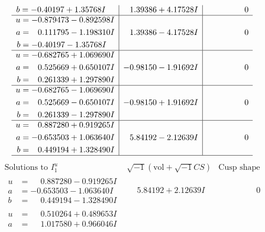 \documentclass[1p]{elsarticle_modified}
\theoremstyle{definition}
\newcommand{\I}{\sqrt{-1}}
\begin{document}
$$\begin{array}{c|c|c}
\begin{aligned}
b &= -0.40197 + 1.35768 I\end{aligned}
 & \phantom{-}1.39386 + 4.17528 I & \phantom{-0.000000 } 0 \\ \hline\begin{aligned}
u &= -0.879473 - 0.892598 I \\
a &= \phantom{-}0.111795 - 1.198310 I \\
b &= -0.40197 - 1.35768 I\end{aligned}
 & \phantom{-}1.39386 - 4.17528 I & \phantom{-0.000000 } 0 \\ \hline\begin{aligned}
u &= -0.682765 + 1.069690 I \\
a &= \phantom{-}0.525669 + 0.650107 I \\
b &= \phantom{-}0.261339 + 1.297890 I\end{aligned}
 & -0.98150 - 1.91692 I & \phantom{-0.000000 } 0 \\ \hline\begin{aligned}
u &= -0.682765 - 1.069690 I \\
a &= \phantom{-}0.525669 - 0.650107 I \\
b &= \phantom{-}0.261339 - 1.297890 I\end{aligned}
 & -0.98150 + 1.91692 I & \phantom{-0.000000 } 0 \\ \hline\begin{aligned}
u &= \phantom{-}0.887280 + 0.919265 I \\
a &= -0.653503 + 1.063640 I \\
b &= \phantom{-}0.449194 + 1.328490 I\end{aligned}
 & \phantom{-}5.84192 - 2.12639 I & \phantom{-0.000000 } 0\\
 \hline 
 \end{array}$$\newpage$$\begin{array}{c|c|c}  
\text{Solutions to }I^u_{1}& \I (\text{vol} + \sqrt{-1}CS) & \text{Cusp shape}\\
 \hline 
\begin{aligned}
u &= \phantom{-}0.887280 - 0.919265 I \\
a &= -0.653503 - 1.063640 I \\
b &= \phantom{-}0.449194 - 1.328490 I\end{aligned}
 & \phantom{-}5.84192 + 2.12639 I & \phantom{-0.000000 } 0 \\ \hline\begin{aligned}
u &= \phantom{-}0.510264 + 0.489653 I \\
a &= \phantom{-}1.017580 + 0.966046 I \\

\end{aligned}
\end{array}$$
\end{document}
